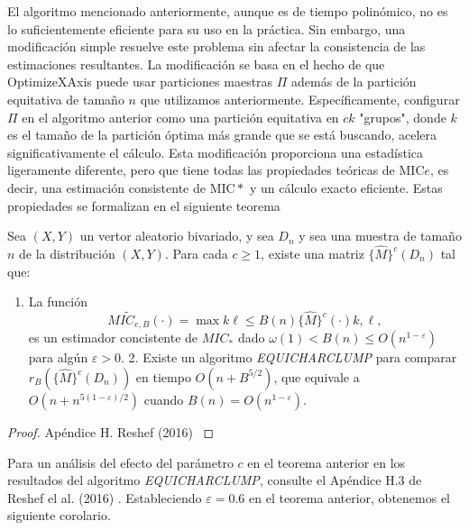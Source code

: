         El algoritmo mencionado anteriormente, aunque es de tiempo polin\'omico, no es lo suficientemente eficiente para su uso en la pr\'actica. Sin embargo, una modificaci\'on simple resuelve este problema sin afectar la consistencia de las estimaciones resultantes. La modificaci\'on se basa en el hecho de que OptimizeXAxis puede usar particiones maestras $\Pi$ adem\'as de la partici\'on equitativa de tama\~no $n$ que utilizamos anteriormente. Espec\'ificamente, configurar $\Pi$ en el algoritmo anterior como una partici\'on equitativa en $c k$ "grupos", donde $k$ es el tama\~no de la partici\'on \'optima m\'as grande que se est\'a buscando, acelera significativamente el c\'alculo. Esta modificaci\'on proporciona una estad\'istica ligeramente diferente, pero que tiene todas las propiedades te\'oricas de $\mathrm{MIC}e$, es decir, una estimaci\'on consistente de $\mathrm{MIC}*$ y un c\'alculo exacto eficiente. Estas propiedades se formalizan en el siguiente teorema
    
        \begin{thm}
            Sea $(X, Y)$  un vertor aleatorio bivariado, y sea $D_n$ y sea una muestra de tama\~no $n$ de la distribuci\'on $(X, Y)$. Para cada $c \geq 1$, existe una matriz $\{\widehat{M}\}^c\left(D_n\right)$ tal que:
            \begin{enumerate}
                \item La funci\'on
                $$
                \widetilde{M I C_{e, B}}(\cdot)=\max {k \ell \leq B(n)}\{\widehat{M}\}^c(\cdot){k, \ell},
                $$
                es un estimador concistente de $M I C_*$ dado $\omega(1)<B(n) \leq O\left(n^{1-\varepsilon}\right)$ para alg\'un $\varepsilon>0$.
                2. Existe un algoritmo \textit{EQUICHARCLUMP} para comparar $r_B\left(\{\widehat{M}\}^c\left(D_n\right)\right)$ en tiempo $O\left(n+B^{5 / 2}\right)$, que equivale a $O\left(n+n^{5(1-\varepsilon) / 2}\right)$ cuando $B(n)=O\left(n^{1-\varepsilon}\right)$.
            \end{enumerate}
        \end{thm}
        \begin{proof}
            Ap\'endice H. Reshef (2016) \cite{Reshef2016}
        \end{proof}

        Para un an\'alisis del efecto del par\'ametro $c$ en el teorema anterior en los resultados del algoritmo \textit{EQUICHARCLUMP}, consulte el Ap\'endice H.3 de Reshef el al. (2016) \cite{Reshef2016}. Estableciendo $\varepsilon=0.6$ en el teorema anterior, obtenemos el siguiente corolario.


